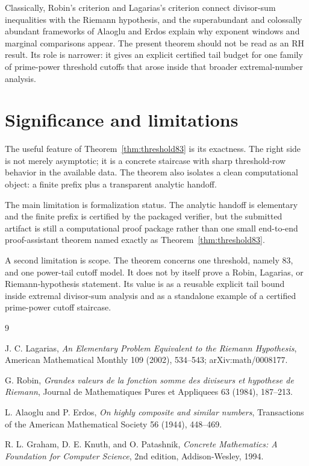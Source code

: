 \documentclass[11pt]{article}
\begin{document}
Classically, Robin's criterion and Lagarias's criterion connect divisor-sum
inequalities with the Riemann hypothesis, and the superabundant and
colossally abundant frameworks of Alaoglu and Erdos explain why exponent
windows and marginal comparisons appear.  The present theorem should not be
read as an RH result.  Its role is narrower: it gives an explicit certified
tail budget for one family of prime-power threshold cutoffs that arose inside
that broader extremal-number analysis.

\section{Significance and limitations}

The useful feature of Theorem~\ref{thm:threshold83} is its exactness.  The
right side is not merely asymptotic; it is a concrete staircase with sharp
threshold-row behavior in the available data.  The theorem also isolates a
clean computational object: a finite prefix plus a transparent analytic
handoff.

The main limitation is formalization status.  The analytic handoff is
elementary and the finite prefix is certified by the packaged verifier, but the
submitted artifact is still a computational proof package rather than one small
end-to-end proof-assistant theorem named exactly as
Theorem~\ref{thm:threshold83}.

A second limitation is scope.  The theorem concerns one threshold, namely
\(83\), and one power-tail cutoff model.  It does not by itself prove a Robin,
Lagarias, or Riemann-hypothesis statement.  Its value is as a reusable explicit
tail bound inside extremal divisor-sum analysis and as a standalone example of
a certified prime-power cutoff staircase.

\begin{thebibliography}{9}

J. C. Lagarias,
\emph{An Elementary Problem Equivalent to the Riemann Hypothesis},
American Mathematical Monthly 109 (2002), 534--543;
arXiv:math/0008177.

G. Robin,
\emph{Grandes valeurs de la fonction somme des diviseurs et hypothese de
Riemann},
Journal de Mathematiques Pures et Appliquees 63 (1984), 187--213.

L. Alaoglu and P. Erdos,
\emph{On highly composite and similar numbers},
Transactions of the American Mathematical Society 56 (1944), 448--469.

R. L. Graham, D. E. Knuth, and O. Patashnik,
\emph{Concrete Mathematics: A Foundation for Computer Science},
2nd edition, Addison-Wesley, 1994.

\end{thebibliography}
\end{document}
